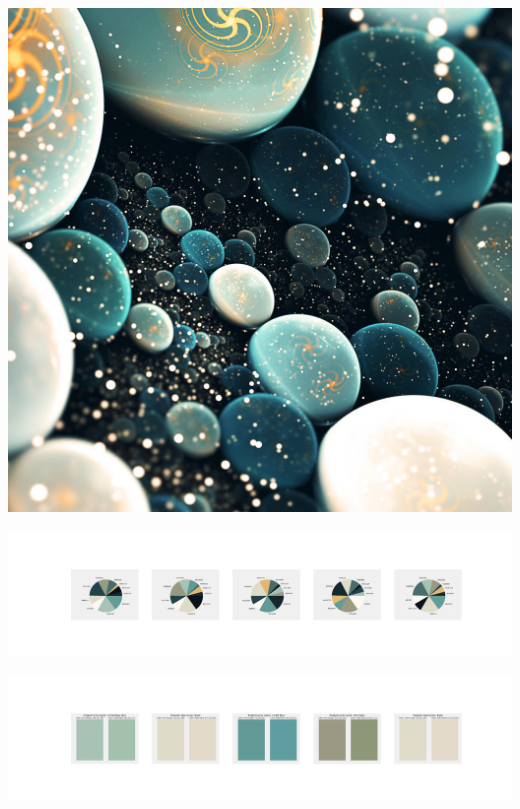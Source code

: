\documentclass[11pt]{article}
\begin{document}
\begin{landscape}
    \begin{center}
    \includegraphics[width=\textwidth]{./nbimg/file (278).jpg}
    \end{center}

    \begin{center}
    \includegraphics[width=250mm]{./nbimg/pie-198.jpg}
    \end{center}

    \begin{center}
    \includegraphics[width=250mm]{./nbimg/peak-198.jpg}
    \end{center}
    


\end{landscape}
\end{document}

